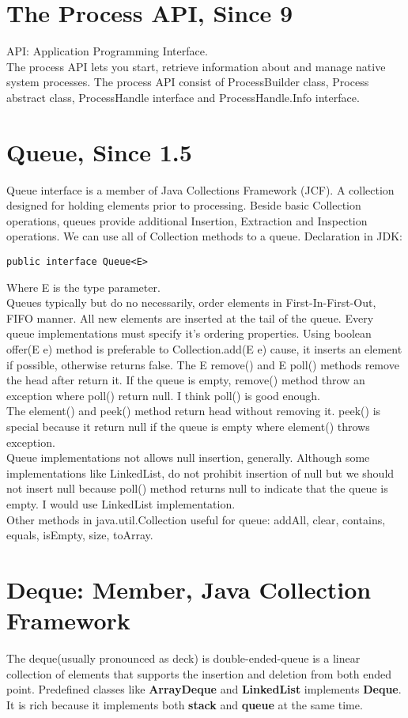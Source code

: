 \documentclass[10 pt]{article}
\begin{document}
\section{The Process API, Since 9}
API: Application Programming Interface. \\
The process API lets you start, retrieve information about and manage native system processes. The process API consist of ProcessBuilder class, Process abstract class, ProcessHandle interface and ProcessHandle.Info interface.

\section{Queue, Since 1.5}
Queue interface is a member of Java Collections Framework (JCF). A collection designed for holding elements prior to processing. Beside basic Collection operations, queues provide additional Insertion, Extraction and Inspection operations. We can use all of Collection methods to a queue. Declaration in JDK:
\begin{lstlisting}
public interface Queue<E>
\end{lstlisting}
Where E is the type parameter. \\
Queues typically but do no necessarily, order elements in First-In-First-Out, FIFO manner. All new elements are inserted at the tail of the queue. Every queue implementations must specify it's ordering properties. Using boolean offer(E e) method is preferable to Collection.add(E e) cause, it inserts an element if possible, otherwise returns false. The E remove() and E poll() methods remove the head after return it. If the queue is empty, remove() method throw an exception where poll() return null. I think poll() is good enough. \\
The element() and peek() method return head without removing it. peek() is special because it return null if the queue is empty where element() throws exception. \\
Queue implementations not allows null insertion, generally. Although some implementations like LinkedList, do not prohibit insertion of null but we should not insert null because poll() method returns null to indicate that the queue is empty. I would use LinkedList implementation. \\
Other methods in java.util.Collection useful for queue: addAll, clear, contains, equals, isEmpty, size, toArray.

\section{Deque: Member, Java Collection Framework}
The deque(usually pronounced as deck) is double-ended-queue is a linear collection of elements that supports the insertion and deletion from both ended point. Predefined classes like \textbf{ArrayDeque} and \textbf{LinkedList} implements \textbf{Deque}. It is rich because it implements both \textbf{stack} and \textbf{queue} at the same time.
\end{document}
